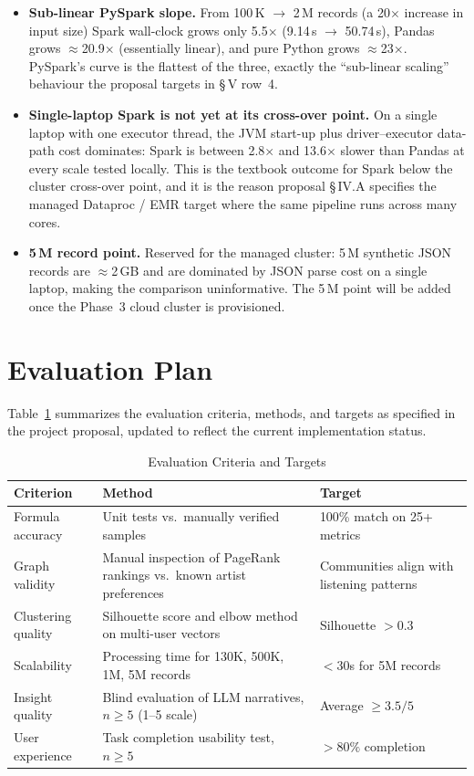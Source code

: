 \documentclass[conference]{IEEEtran}
\begin{document}
\begin{itemize}
    \item \textbf{Sub-linear PySpark slope.} From 100\,K $\rightarrow$ 2\,M records (a 20$\times$ increase in input size) Spark wall-clock grows only 5.5$\times$ (9.14\,s $\rightarrow$ 50.74\,s), Pandas grows $\approx$20.9$\times$ (essentially linear), and pure Python grows $\approx$23$\times$. PySpark's curve is the flattest of the three, exactly the ``sub-linear scaling'' behaviour the proposal targets in \S\,V row~4.
    \item \textbf{Single-laptop Spark is not yet at its cross-over point.} On a single laptop with one executor thread, the JVM start-up plus driver--executor data-path cost dominates: Spark is between 2.8$\times$ and 13.6$\times$ slower than Pandas at every scale tested locally. This is the textbook outcome for Spark below the cluster cross-over point, and it is the reason proposal \S\,IV.A specifies the managed Dataproc / EMR target where the same pipeline runs across many cores.
    \item \textbf{5\,M record point.} Reserved for the managed cluster: 5\,M synthetic JSON records are $\approx$2\,GB and are dominated by JSON parse cost on a single laptop, making the comparison uninformative. The 5\,M point will be added once the Phase~3 cloud cluster is provisioned.
\end{itemize}

\section{Evaluation Plan}

Table~\ref{tab:eval} summarizes the evaluation criteria, methods, and targets as specified in the project proposal, updated to reflect the current implementation status.

\begin{table}[ht]
\centering
\caption{Evaluation Criteria and Targets}
\label{tab:eval}
\renewcommand{\arraystretch}{1.3}
\begin{tabular}{p{2.5cm} p{7.0cm} p{5.5cm}}
\toprule
\textbf{Criterion} & \textbf{Method} & \textbf{Target} \\
\midrule
Formula accuracy & Unit tests vs.\ manually verified samples & 100\% match on 25+ metrics \\
Graph validity & Manual inspection of PageRank rankings vs.\ known artist preferences & Communities align with listening patterns \\
Clustering quality & Silhouette score and elbow method on multi-user vectors & Silhouette $> 0.3$ \\
Scalability & Processing time for 130K, 500K, 1M, 5M records & $<30$s for 5M records \\
Insight quality & Blind evaluation of LLM narratives, $n \geq 5$ (1--5 scale) & Average $\geq 3.5/5$ \\
User experience & Task completion usability test, $n \geq 5$ & $>80\%$ completion \\
\bottomrule
\end{tabular}
\end{table}
\end{document}
